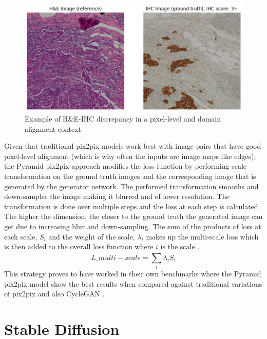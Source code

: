 \begin{figure}[h]
    \centering
    \includegraphics[width=1\linewidth]{2_LiteratureSurvey/figures/he-ihc-alignmentIssue.png}
    \caption{Example of H\&E-IHC discrepancy in a pixel-level and domain alignment context}
    \label{fig:he-ihc-alignment-issue-example}
\end{figure}
Given that traditional pix2pix models work best with image-pairs that have good pixel-level alignment (which is why often the inputs are image maps like edges), the Pyramid pix2pix approach modifies the loss function by performing scale transformation on the ground truth images and the corresponding image that is generated by the generator network. The performed transformation smooths and down-samples the image making it blurred and of lower resolution. The transformation is done over multiple steps and the loss at each step is calculated. The higher the dimension, the closer to the ground truth the generated image can get due to increasing blur and down-sampling. The sum of the products of  loss at each scale, $S_{i}$ and the weight of the scale, $\lambda_{i}$ makes up the multi-scale loss which is then added to the overall loss function where $i$ is the scale  \parencite[Equation 2, p. 6]{Liu2022BCI:Pix2pix}. 
\begin{equation}\label{eq:multi-scale-loss}
L\_{multi−scale} = \sum_{i}^{} \lambda_{i}S_{i}
\end{equation}
This strategy proves to have worked in their own benchmarks where the Pyramid pix2pix model show the best results when compared against traditional variations of pix2pix and also CycleGAN \parencite[Table 1, p. 7]{Liu2022BCI:Pix2pix}.  

\section{Stable Diffusion}

